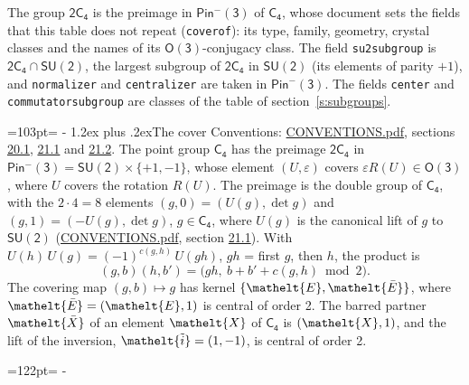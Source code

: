 \documentclass[10pt,a4paper]{article}
\makeatletter
\renewcommand\section{\@startsection{section}{1}{\z@}{-3ex plus -1ex minus -.2ex}%
  {1.2ex plus .2ex}{\normalfont\large\sffamily\bfseries\color{parttitle}}}
\newcommand{\needspace}[1]{\par\penalty-100\begingroup\dimen0=#1\relax\dimen2=\pagegoal
  \advance\dimen2-\pagetotal\ifdim\dimen0>\dimen2\relax\ifdim\dimen2>0pt\vfil\break\fi\fi
  \endgroup}
\numberwithin{equation}{section}
\newcommand{\eltfont}[1]{{\let\sigma\eltsigma\mathelt{#1}}}
\newcommand{\grp}[1]{\mathsf{#1}}
\newcommand{\elt}[1]{\eltfont{#1}}
\newcommand{\dirprod}{\times}
\newcommand{\barred}[1]{\bar{#1}}
\newcommand{\lift}[1]{\tilde{#1}}
\makeatother
\begin{document}
\leavevmode\label{n:element.inversion}\label{n:group.preimage}The group $\grp{2C_{4}}$ is the preimage in $\grp{Pin^{-}(3)}$ of \href{../../../rotation/data/pdf/C4.pdf}{$\grp{C_{4}}$}, whose document sets the fields that this table does not repeat (\texttt{coverof}): its type, family, geometry, crystal classes and the names of its \href{../../../rotation/data/pdf/O3.pdf}{$\grp{O(3)}$}-conjugacy class. The field \texttt{su2subgroup} is $\grp{2C_{4}} \cap \grp{SU(2)}$, the largest subgroup of $\grp{2C_{4}}$ in $\grp{SU(2)}$ (its elements of parity $+1$), and \texttt{normalizer} and \texttt{centralizer} are taken in $\grp{Pin^{-}(3)}$. The fields \texttt{center} and \texttt{commutatorsubgroup} are classes of the table of section~\ref{s:subgroups}.
\needspace{103pt}
\section{The cover}\label{s:cover}
Conventions: \href{../../CONVENTIONS.pdf}{CONVENTIONS.pdf}, sections \href{../../CONVENTIONS.pdf\#conv.20.1}{20.1}, \href{../../CONVENTIONS.pdf\#conv.21.1}{21.1} and \href{../../CONVENTIONS.pdf\#conv.21.2}{21.2}.
\leavevmode\label{n:group.pin.minus}\label{n:group.su2}\label{n:local.pin.sign}\label{n:matrix.covered}\label{n:matrix.lift.su2}\label{n:index.bar}The point group $\grp{C_{4}}$ has the preimage $\grp{2C_{4}}$ in $\grp{Pin^{-}(3)} = \grp{SU(2)} \dirprod \{+1, -1\}$, whose element $(U, \varepsilon)$ covers $\varepsilon R(U) \in \grp{O(3)}$, where $U$ covers the rotation $R(U)$. The preimage is the double group of $\grp{C_{4}}$, with the $2 \cdot 4 = 8$ elements $(g, 0) = (U(g), \det g)$ and $(g, 1) = (-U(g), \det g)$, $g \in \grp{C_{4}}$, where $U(g)$ is the canonical lift of $g$ to $\grp{SU(2)}$ (\href{../../CONVENTIONS.pdf}{CONVENTIONS.pdf}, section \href{../../CONVENTIONS.pdf\#conv.21.1}{21.1}). \label{n:function.cocycle}With $U(h)\,U(g) = (-1)^{c(g,h)}\,U(gh)$, $gh$ = first $g$, then $h$, the product is
\begin{equation}\label{e:product}(g, b)(h, b') = \bigl(gh,\ b + b' + c(g, h) \bmod 2\bigr).\end{equation}
\leavevmode\label{n:mark.bar}The covering map $(g, b) \mapsto g$ has kernel $\{\elt{E}, \elt{\barred{E}}\}$, where $\elt{\barred{E}} = (\elt{E}, 1)$ is central of order 2. \label{n:element.named}\label{n:mark.lift}The barred partner $\elt{\barred{X}}$ of an element $\elt{X}$ of $\grp{C_{4}}$ is $(\elt{X}, 1)$, and the lift of the inversion, $\elt{\lift{i}} = (1, -1)$, is central of order 2.
\needspace{122pt}
\end{document}
